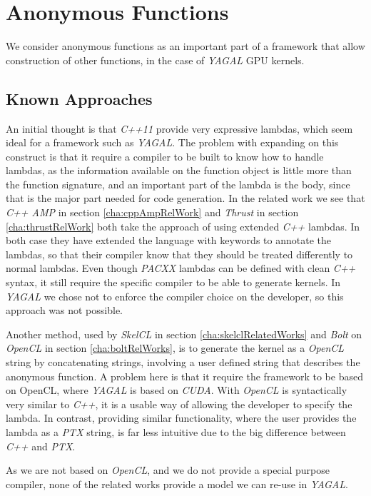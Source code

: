 \section{Anonymous Functions}
We consider anonymous functions as an important part of a framework that allow construction of other functions, in the case of \textit{YAGAL} GPU kernels.

\subsection{Known Approaches}
An initial thought is that \textit{C++11} provide very expressive lambdas, which seem ideal for a framework such as \textit{YAGAL}. The problem with expanding on this construct is that it require a compiler to be built to know how to handle lambdas, as the information available on the function object is little more than the function signature\cite{cppLambdaRef}, and an important part of the lambda is the body, since that is the major part needed for code generation. In the related work we see that \textit{C++ AMP} in section \ref{cha:cppAmpRelWork} and \textit{Thrust} in section \ref{cha:thrustRelWork} both take the approach of using extended \textit{C++} lambdas. In both case they have extended the language with keywords to annotate the lambdas, so that their compiler know that they should be treated differently to normal lambdas. Even though \textit{PACXX} lambdas can be defined with clean \textit{C++} syntax, it still require the specific compiler to be able to generate kernels. In \textit{YAGAL} we chose not to enforce the compiler choice on the developer, so this approach was not possible.

Another method, used by \textit{SkelCL} in section \ref{cha:skelclRelatedWorks} and \textit{Bolt} on \textit{OpenCL} in section \ref{cha:boltRelWorks}, is to generate the kernel as a \textit{OpenCL} string by concatenating strings, involving a user defined string that describes the anonymous function. A problem here is that it require the framework to be based on OpenCL, where \textit{YAGAL} is based on \textit{CUDA}. With \textit{OpenCL} is syntactically very similar to \textit{C++}, it is a usable way of allowing the developer to specify the lambda. In contrast, providing similar functionality, where the user provides the lambda as a \textit{PTX} string, is far less intuitive due to the big difference between \textit{C++} and \textit{PTX}.

As we are not based on \textit{OpenCL}, and we do not provide a special purpose compiler, none of the related works provide a model we can re-use in \textit{YAGAL}.

